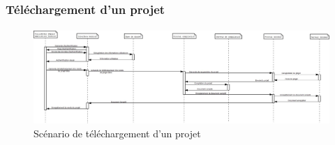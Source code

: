 \documentclass[a4paper,12pt]{article}
\begin{document}
\newpage
\subsubsection{Téléchargement d'un projet}
\paragraph{}
\begin{figure}[!ht]
\begin{center}
  \includegraphics[width=1\textwidth, angle=90]{./Diagramme/Android/telechargementRenduProjet.jpg}
\end{center}
  \caption{Scénario de téléchargement d'un projet}
  \label{androidDownloadProject}
\end{figure}

\newpage
\listoffigures
\end{document}
